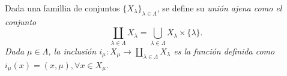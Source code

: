 
\begin{definition}
Dada una famillia de conjuntos $\{ X_{\lambda} \}_{\lambda \in \Lambda}$, se define su \itshape{unión ajena} como el conjunto
\begin{equation*}
    \coprod_{\lambda \in \Lambda} X_{\lambda} = \bigcup_{\lambda \in \Lambda} X_{\lambda} \times \{ \lambda \}.
\end{equation*}
Dada $\mu \in \Lambda$, la \itshape{inclusión} $i_{\mu} : X_{\mu} \longrightarrow \coprod_{\lambda \in \Lambda} X_{\lambda}$ es la función definida como $i_{\mu}(x) = (x, \mu), \forall x \in X_{\mu}$.
\end{definition}
